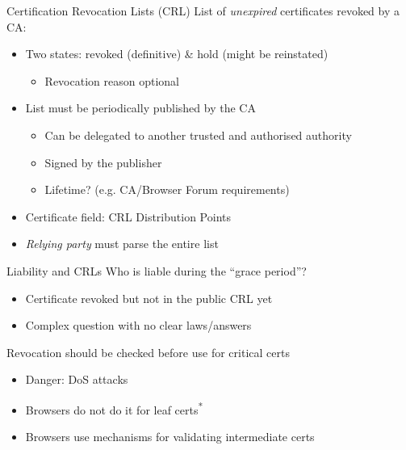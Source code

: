 \begin{frame}{Certification Revocation Lists (CRL)}
  List of \emph{unexpired} certificates revoked by a CA:
  \begin{itemize}[<+(1)->]
    \item Two states: revoked (definitive) \& hold (might be reinstated)
    \begin{itemize}
      \item Revocation reason optional
    \end{itemize}
    \item List must be periodically published by the CA
    \begin{itemize}
      \item Can be delegated to another trusted and authorised authority
      \item Signed by the publisher
      \item Lifetime? (e.g. CA/Browser Forum requirements)
    \end{itemize}
    \item Certificate field: CRL Distribution Points
    \item \emph{Relying party} must parse the entire list
  \end{itemize}
\end{frame}

\begin{frame}{Liability and CRLs}
  \pause
  Who is liable during the \enquote{grace period}?
  \begin{itemize}[<+(1)->]
    \item Certificate revoked but not in the public CRL yet
    \item Complex question with no clear laws/answers
  \end{itemize}

  \pause
  Revocation should be checked before use for critical certs
  \begin{itemize}[<+(1)->]
    \item Danger: DoS attacks
    \item Browsers do not do it for leaf certs\textsuperscript{*}
    \item Browsers use mechanisms for validating intermediate certs
  \end{itemize}
\end{frame}

